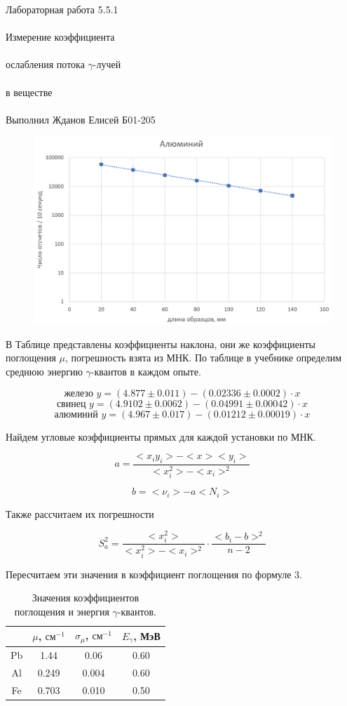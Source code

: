 \documentclass{astroedu-lab}
\begin{document}
\begin{problem}{\huge Лабораторная работа 5.5.1\\\\Измерение коэффициента\\\\ослабления потока $\gamma$-лучей\\\\в веществе\\\\Выполнил Жданов Елисей Б01-205}
\begin{figure}[h]
\includegraphics[scale=0.23]{30.png}
\centering
\end{figure}

\newpage

В Таблице представлены коэффициенты наклона, они же коэффициенты поглощения $\mu$, погрешность взята из МНК. По таблице в учебнике определим среднюю энергию $\gamma$-квантов в каждом опыте.

\[
\text{железо } y = (4.877 \pm 0.011) - (0.02336 \pm 0.0002) \cdot x\]
\[\text{свинец } y = (4.9102 \pm 0.0062) - (0.04991 \pm 0.00042) \cdot x\]
\[\text{алюминий } y = (4.967 \pm 0.017) - (0.01212 \pm 0.00019) \cdot x
\]

Найдем угловые коэффициенты прямых для каждой установки по МНК.

\[
	a = \frac{<x_i y_i> - < x > < y_i >}{< x_i^2> - < x_i >^2}
\]

\[
	b = < \nu_i > - a < N_i >
\]

Также рассчитаем их погрешности

\begin{equation}
	S_a^2 = \frac{< x_i^2>}{< x_i^2 > - < x_i >^2} \cdot \frac{<  b_i - b > ^2}{n - 2}
\end{equation}

Пересчитаем эти значения в коэффициент поглощения по формуле 3.

\begin{table}[h!]
\begin{tabular}{|c|c|c|c|}
\hline
   & $\mu$, $\text{см}^{-1}$ & $\sigma_\mu$, $\text{см}^{-1}$ & $E_\gamma$, МэВ \\ \hline
Pb & 1.44                    & 0.06                           & 0.60             \\ \hline
Al & 0.249                   & 0.004                          & 0.60             \\ \hline
Fe & 0.703                   & 0.010                          & 0.50             \\ \hline
\end{tabular}
\centering
\caption{Значения коэффициентов поглощения и энергия $\gamma$-квантов.}
\end{table}







\end{problem}
\end{document}
